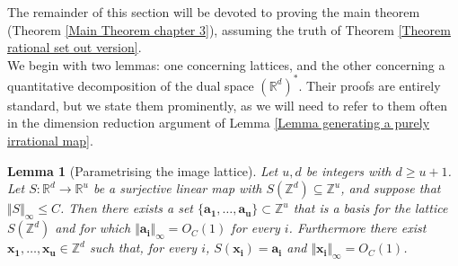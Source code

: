 \documentclass[12pt,a4paper,twoside,reqno]{amsart}
\newtheorem{Lemma}[Theorem]{Lemma}
\numberwithin{equation}{section}
\begin{document}
The remainder of this section will be devoted to proving the main theorem (Theorem \ref{Main Theorem chapter 3}), assuming the truth of Theorem \ref{Theorem rational set out version}. \\

We begin with two lemmas: one concerning lattices, and the other concerning a quantitative decomposition of the dual space $(\mathbb{R}^d)^*$. Their proofs are entirely standard, but we state them prominently, as we will need to refer to them often in the dimension reduction argument of Lemma \ref{Lemma generating a purely irrational map}.  
\begin{Lemma}[Parametrising the image lattice]
\label{Lemma parametrising the image lattice}
Let $u,d$ be integers with $d\geqslant u+1$. Let $S:\mathbb{R}^d \longrightarrow \mathbb{R}^u$ be a surjective linear map with $S(\mathbb{Z}^d) \subseteq \mathbb{Z}^u$, and suppose that $\Vert S\Vert_\infty \leqslant C$. Then there exists a set $\{\mathbf{a_1},\dots,\mathbf{a_u}\}\subset \mathbb{Z}^u$ that is a basis for the lattice $S(\mathbb{Z}^d)$ and for which $\Vert \mathbf{a_i}\Vert_\infty = O_C(1)$ for every $i$. Furthermore there exist $\mathbf{x_1},\dots,\mathbf{x_u}\in\mathbb{Z}^d$ such that, for every $i$, $S(\mathbf{x_i}) = \mathbf{a_i}$ and $\Vert \mathbf{x_i}\Vert_\infty = O_{C}(1)$. 
\end{Lemma}
\end{document}
